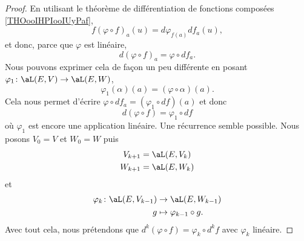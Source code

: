 \begin{proof}
	En utilisant le théorème de différentiation de fonctions composées \ref{THOooIHPIooIUyPaf},
	\begin{equation}
		f(\varphi\circ f)_a(u)=d\varphi_{f(a)}df_a(u),
	\end{equation}
	et donc, parce que \( \varphi\) est linéaire,
	\begin{equation}
		d(\varphi\circ f)_a=\varphi\circ df_a.
	\end{equation}
	Nous pouvons exprimer cela de façon un peu différente en posant \( \varphi_1\colon \aL(E,V)\to \aL(E,W)\),
	\begin{equation}
		\varphi_1(\alpha)(a)=(\varphi\circ \alpha)(a).
	\end{equation}
	Cela nous permet d'écrire \( \varphi\circ df_a=(\varphi_1\circ df)(a)\) et donc
	\begin{equation}        \label{EQooUJPWooTzgSJx}
		d(\varphi\circ f)=\varphi_1\circ df
	\end{equation}
	où \( \varphi_1\) est encore une application linéaire. Une récurrence semble possible. Nous posons \( V_0=V\) et \( W_0=W\) puis
	\begin{subequations}
		\begin{align}
			V_{k+1} & =\aL(E,V_k) \\
			W_{k+1} & =\aL(E,W_k)
		\end{align}
	\end{subequations}
	et
	\begin{equation}
		\begin{aligned}
			\varphi_k\colon \aL(E,V_{k-1}) & \to \aL(E,W_{k-1})            \\
			g                              & \mapsto \varphi_{k-1}\circ g.
		\end{aligned}
	\end{equation}
	Avec tout cela, nous prétendons que \( d^k(\varphi\circ f)=\varphi_k\circ d^kf\) avec \( \varphi_k\) linéaire.


\end{proof}
